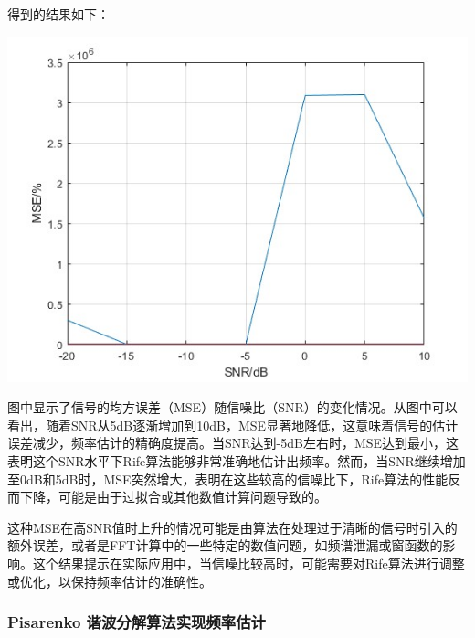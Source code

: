 \documentclass[a4paper,12pt]{article}
\begin{document}
得到的结果如下：

\centering 
\includegraphics[width=0.8\linewidth]{images/2_Application/Rife.jpg}
\justifying

图中显示了信号的均方误差（MSE）随信噪比（SNR）的变化情况。从图中可以看出，随着SNR从5dB逐渐增加到10dB，MSE显著地降低，这意味着信号的估计误差减少，频率估计的精确度提高。当SNR达到-5dB左右时，MSE达到最小，这表明这个SNR水平下Rife算法能够非常准确地估计出频率。然而，当SNR继续增加至0dB和5dB时，MSE突然增大，表明在这些较高的信噪比下，Rife算法的性能反而下降，可能是由于过拟合或其他数值计算问题导致的。

这种MSE在高SNR值时上升的情况可能是由算法在处理过于清晰的信号时引入的额外误差，或者是FFT计算中的一些特定的数值问题，如频谱泄漏或窗函数的影响。这个结果提示在实际应用中，当信噪比较高时，可能需要对Rife算法进行调整或优化，以保持频率估计的准确性。


\subsubsection{Pisarenko 谐波分解算法实现频率估计}
\end{document}

